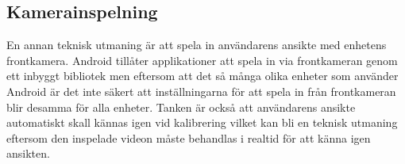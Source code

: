 \subsection{Kamerainspelning}
En annan teknisk utmaning är att spela in användarens ansikte med enhetens frontkamera. Android tillåter applikationer att spela in via frontkameran genom ett inbyggt bibliotek men eftersom att det så många olika enheter som använder Android är det inte säkert att inställningarna för att spela in från frontkameran blir desamma för alla enheter. Tanken är också att användarens ansikte automatiskt skall kännas igen vid kalibrering vilket kan bli en teknisk utmaning eftersom den inspelade videon måste behandlas i realtid för att känna igen ansikten.